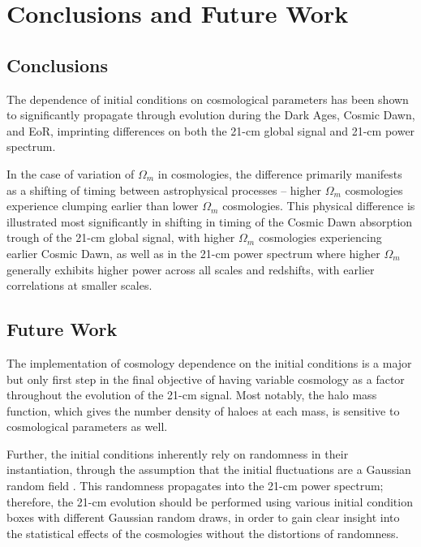 \documentclass[floats,floatfix,showpacs,amssymb,prd,superscriptaddress,nofootinbib]{revtex4-2} %
\begin{document}

\section{Conclusions and Future Work}
\subsection{Conclusions}
The dependence of initial conditions on cosmological parameters has been shown to significantly propagate through evolution during the Dark Ages, Cosmic Dawn, and EoR, imprinting differences on both the 21-cm global signal and 21-cm power spectrum. 

In the case of variation of $\Omega_m$ in cosmologies, the difference primarily manifests as a shifting of timing between astrophysical processes -- higher $\Omega_m$ cosmologies experience clumping earlier than lower $\Omega_m$ cosmologies. This physical difference is illustrated most significantly in shifting in timing of the Cosmic Dawn absorption trough of the 21-cm global signal, with higher $\Omega_m$ cosmologies experiencing earlier Cosmic Dawn, as well as in the 21-cm power spectrum where higher $\Omega_m$ generally exhibits higher power across all scales and redshifts, with earlier correlations at smaller scales.
\subsection{Future Work}
The implementation of cosmology dependence on the initial conditions is a major but only first step in the final objective of having variable cosmology as a factor throughout the evolution of the 21-cm signal. Most notably, the halo mass function, which gives the number density of haloes at each mass, is sensitive to cosmological parameters as well. 

Further, the initial conditions inherently rely on randomness in their instantiation, through the assumption that the initial fluctuations are a Gaussian random field \citep{Guth_Pi_1982, Brandenberger_1985}. This randomness propagates into the 21-cm power spectrum; therefore, the 21-cm evolution should be performed using various initial condition boxes with different Gaussian random draws, in order to gain clear insight into the statistical effects of the cosmologies without the distortions of randomness.
\end{document}
